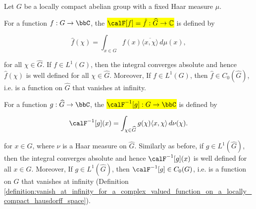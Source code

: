 \begin{definition} \label{definition:fourier_transform_of_a_function_on_a_locally_compact_abelian_group}
    Let $G$ be a locally compact abelian group with a fixed Haar measure $\mu$.

    For a function $f: G \to \bbC$, the  \hl{$\calF[f] = \hat{f} : \widehat{G} \to \mathbb{C}$} is defined by

    $$\hat{f}(\chi) = \int_{x \in G} f(x) \overline{\langle x, \chi \rangle} \, d\mu(x),$$

     for all $\chi \in \widehat{G}$. If $f \in L^1(G)$, then the integral converges absolute and hence $\hat{f}(\chi)$ is well defined for all $\chi \in \hat{G}$. Moreover, If $f \in L^1(G)$, then $\hat{f} \in C_0(\widehat{G})$, i.e. is a function on $\widehat{G}$ that vanishes at infinity.

    For a function $g: \widehat{G} \to \bbC$, the  \hl{$\calF^{-1}[g]: G \to \bbC$} is defined by 

    $$\calF^{-1}[g](x) = \int_{\chi \in \widehat{G}} g(\chi) {\langle x, \chi \rangle} \, d\nu(\chi).$$

    for $x \in G$, where $\nu$ is a Haar measure on $\widehat{G}$. Similarly as before, if $g \in L^1(\widehat{G})$, then the integral converges absolute and hence $\calF^{-1}[g](x)$ is well defined for all $x \in G$. Moreover, If $g \in L^1(\widehat{G})$, then $\calF^{-1}[g] \in C_0(G)$, i.e. is a function on $G$ that vanishes at infinity (Definition \ref{definition:vanish_at_infinity_for_a_complex_valued_function_on_a_locally_compact_hausdorff_space}).
\end{definition}